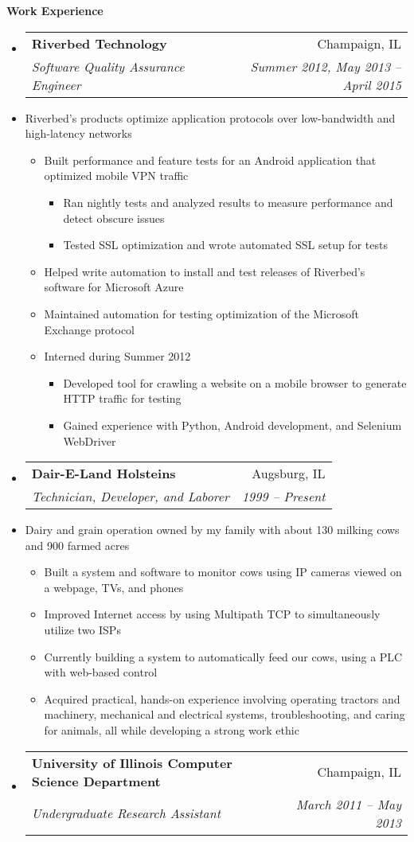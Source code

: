 \documentclass[letterpaper,11pt]{article}
\makeatletter
\newcommand{\resitem}[1]{\item #1 \vspace{-2pt}}
\newcommand{\resheading}[1]{{\large \colorbox{mygrey}{\begin{minipage}{\textwidth}{\textbf{#1 \vphantom{p\^{E}}}}\end{minipage}}}}
\newcommand{\ressubheading}[4]{
\begin{tabular*}{7.0in}{l@{\extracolsep{\fill}}r}
		\textbf{#1} & #2 \\
		\textit{#3} & \textit{#4} \\
\end{tabular*}\vspace{-6pt}}
\makeatother
\begin{document}
\resheading{Work Experience}
\begin{itemize}
\item
	\ressubheading{Riverbed Technology}{Champaign, IL}{Software Quality Assurance Engineer}{Summer 2012, May 2013 -- April 2015}
	\item[]{Riverbed's products optimize application protocols over low-bandwidth and high-latency networks}\vspace{-6pt}
	\begin{itemize}
		\resitem{Built performance and feature tests for an Android application that optimized mobile VPN traffic}
			\begin{itemize}
				\resitem{Ran nightly tests and analyzed results to measure performance and detect obscure issues}
				\resitem{Tested SSL optimization and wrote automated SSL setup for tests}
			\end{itemize}
		\resitem{Helped write automation to install and test releases of Riverbed's software for Microsoft Azure}
		\resitem{Maintained  automation for testing optimization of the Microsoft Exchange protocol}
		\resitem{Interned during Summer 2012}
			\begin{itemize}
				\resitem{Developed tool for crawling a website on a mobile browser to generate HTTP traffic for testing}
				\resitem{Gained experience with Python, Android development, and Selenium WebDriver}
			\end{itemize}
	\end{itemize}
\item
	\ressubheading{Dair-E-Land Holsteins}{Augsburg, IL}{Technician, Developer, and Laborer}{1999 -- Present}
	\item[]{Dairy and grain operation owned by my family with about 130 milking cows and 900 farmed acres}\vspace{-6pt}
	\begin{itemize}
		\resitem{Built a system and software to monitor cows using IP cameras viewed on a webpage, TVs, and phones}
		\resitem{Improved Internet access by using Multipath TCP to simultaneously utilize two ISPs}
		\resitem{Currently building a system to automatically feed our cows, using a PLC with web-based control}
		\resitem{Acquired practical, hands-on experience involving operating tractors and machinery, mechanical and electrical systems, troubleshooting, and caring for animals, all while developing a strong work ethic}
	\end{itemize}
\item
	\ressubheading{University of Illinois Computer Science Department}{Champaign, IL}{Undergraduate Research Assistant}{March 2011 -- May 2013}

\end{itemize}
\end{document}
